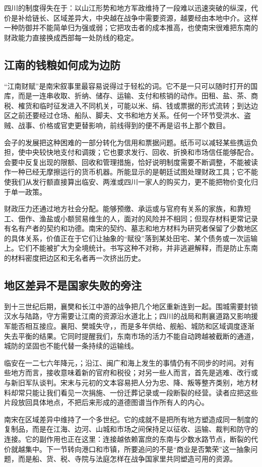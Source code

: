 四川的制度得失在于：以山江形势和地方军政维持了一段难以迅速突破的纵深，代价是补给链长、区域差异大，中央越在战争中需要资源，越要经由本地中介。这样一种防御并不能简单归为强或弱；它把攻击者的成本推高，也使南宋很难把东南的财政能力直接换成西部每一处防线的稳定。

\subsection{江南的钱粮如何成为边防}

“江南财赋”是南宋叙事里最容易说得过于轻松的词。它不是一只可以随时打开的国库，而是一连串收取、折纳、储存、运输、支付和核销的动作。田租、盐、茶、商税、榷货和临时征发进入不同机关，可能以米、绢、钱或票据的形式流转；到达边区之前还要经过仓场、船队、脚夫、文书和地方关系。任何一个环节受洪水、盗贼、战事、价格或官吏更替影响，前线得到的便不再是诏书上那个数目。

会子的发展把这种困难的一部分转化为信用和票据问题。纸币可以减轻某些携运负担，使中央较快地支付和调拨；它也要求发行、回收、折换和市场信任能够配合。会要中反复出现的限额、回收和管理措施，恰好说明制度需要不断调整，不能被读作一种已经无摩擦运行的货币机器。所能显示的是朝廷试图处理财政工具；它不能使我们从发行额直接算出临安、两淮或四川一家人的购买力，更不能把物价变化归于单一政策。

财政压力还通过地方社会分配。能够预缴、承运或与官府有关系的家族，和靠短工、佃作、渔盐或小额贸易维生的人，面对的风险并不相同；但现存材料更常记录有名有产者的契约和功德。南宋的契约、墓志和地方材料为研究者保留了少数地区的具体关系，价值正在于它们让抽象的“赋役”落到某处田宅、某个债务或一次运输上。它们不能被扩大为全境统计。书写这种不对称，并非逃避解释，而是防止东南的材料密度把边区和无名者再一次挤出历史。

\subsection{地区差异不是国家失败的旁注}

到十三世纪后期，襄樊和长江中游的战争把几个地区重新连到一起。围城需要封锁汉水与陆路，守方需要让江南的资源沿水道北上；四川的战局和荆襄道路又影响援军能否相互接应。襄阳、樊城失守，，而是多年供给、舰船、城防和区域调度逐渐失去平衡的结果。它同时提醒我们，东南市场的活力不能自动跨越被截断的通道，城防的坚固也不能代替一条持续的运输线。

临安在一二七六年降元，；沿江、闽广和海上发生的事情仍有不同步的时间。对有些地方而言，接收意味着新的官府和税役；对另一些人而言，首先是逃难、改行或与新旧军队谈判。宋末与元初的文本容易把人分为忠、降、叛等整齐类别，地方材料却常只能让我们看见一次捐施、一份迁葬记录或一段断裂的经营。读者应把这些片段放回具体地点，不把后来形成的道德图谱当作所有人的内心。

南宋在区域差异中维持了一个多世纪。它的成就不是把所有地方塑造成同一制度的复制品，而是在江海、边河、山城和市场之间保持足以征收、运输、裁判和防守的连接。它的副作用也正在这里：连接越依赖富庶的东南与少数水路节点，断裂的代价就越集中。下一节转向港口和市镇，所要追问的不是“商业是否繁荣”这一抽象问题，而是船、货、税、寺院与法庭怎样在战争国家里共同塑造可用的资源。
